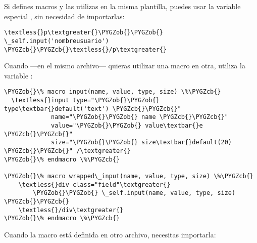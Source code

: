 \documentclass[letterpaper,10pt,spanish]{sphinxmanual}
\def\PYGZob{\char`\{}
\def\PYGZcb{\char`\}}
\begin{document}
Si defines macros y las utilizas en la misma plantilla, puedes usar la variable especial , sin necesidad de importarlas:

\begin{Verbatim}[commandchars=\\\{\}]
\textless{}p\textgreater{}\PYGZob{}\PYGZob{} \_self.input('nombreusuario') \PYGZcb{}\PYGZcb{}\textless{}/p\textgreater{}
\end{Verbatim}

Cuando ---en el mismo archivo--- quieras utilizar una macro en otra, utiliza la variable :

\begin{Verbatim}[commandchars=\\\{\}]
\PYGZob{}\% macro input(name, value, type, size) \%\PYGZcb{}
  \textless{}input type="\PYGZob{}\PYGZob{} type\textbar{}default('text') \PYGZcb{}\PYGZcb{}"
             name="\PYGZob{}\PYGZob{} name \PYGZcb{}\PYGZcb{}"
             value="\PYGZob{}\PYGZob{} value\textbar{}e \PYGZcb{}\PYGZcb{}"
             size="\PYGZob{}\PYGZob{} size\textbar{}default(20) \PYGZcb{}\PYGZcb{}" /\textgreater{}
\PYGZob{}\% endmacro \%\PYGZcb{}

\PYGZob{}\% macro wrapped\_input(name, value, type, size) \%\PYGZcb{}
    \textless{}div class="field"\textgreater{}
        \PYGZob{}\PYGZob{} \_self.input(name, value, type, size) \PYGZcb{}\PYGZcb{}
    \textless{}/div\textgreater{}
\PYGZob{}\% endmacro \%\PYGZcb{}
\end{Verbatim}

Cuando la macro está definida en otro archivo, necesitas importarla:
\end{document}
